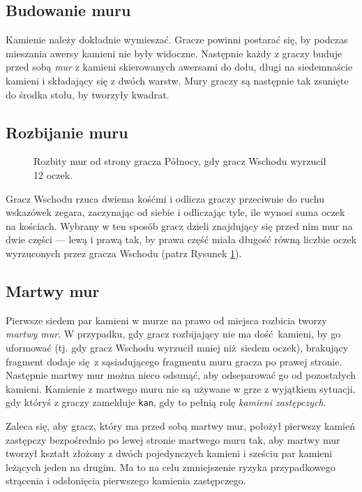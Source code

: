 \subsection{Budowanie muru}
Kamienie należy dokładnie wymieszać.
Gracze powinni postarać się, by podczas mieszania awersy kamieni nie były
widoczne.
Następnie każdy z graczy buduje przed sobą \emph{mur} z kamieni skierowanych
awersami do dołu, długi na siedemnaście kamieni i składający się z dwóch warstw.
Mury graczy są następnie tak zsunięte do środka stołu, by tworzyły kwadrat.

\subsection{Rozbijanie muru}
\begin{figure}[h]
    \centering
    
    \caption{Rozbity mur od strony gracza Północy, gdy gracz Wschodu wyrzucił 12
    oczek.}
    \label{fig:rozbijanie}
\end{figure}
Gracz Wschodu rzuca dwiema kośćmi i odlicza graczy przeciwnie do ruchu wskazówek
zegara, zaczynając od siebie i odliczając tyle, ile wynosi suma oczek na
kościach.
Wybrany w ten sposób gracz dzieli znajdujący się przed nim mur na dwie części
--- lewą i prawą tak, by prawa część miała długość równą liczbie oczek
wyrzuconych przez gracza Wschodu (patrz Rysunek \ref{fig:rozbijanie}).

\subsection{Martwy mur}
Pierwsze siedem par kamieni w murze na prawo od miejsca rozbicia tworzy \emph{martwy
mur}.
W przypadku, gdy gracz rozbijający nie ma dość kamieni, by go uformować (tj. gdy
gracz Wschodu wyrzucił mniej niż siedem oczek), brakujący fragment dodaje się z
sąsiadującego fragmentu muru gracza po prawej stronie.
Następnie martwy mur można nieco odsunąć, aby odseparować go od pozostałych
kamieni.
Kamienie z martwego muru nie są używane w grze z wyjątkiem sytuacji, gdy któryś
z graczy zamelduje \texttt{kan}, gdy to pełnią rolę \emph{kamieni zastępczych}.

Zaleca się, aby gracz, który ma przed sobą martwy mur, położył pierwszy kamień
zastępczy bezpośrednio po lewej stronie martwego muru tak, aby martwy mur
tworzył kształt złożony z dwóch pojedynczych kamieni i sześciu par kamieni
leżących jeden na drugim.
Ma to na celu zmniejszenie ryzyka przypadkowego strącenia i odsłonięcia
pierwszego kamienia zastępczego.

